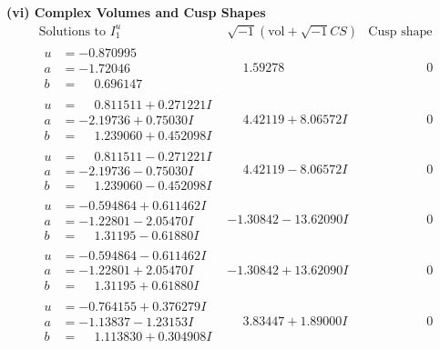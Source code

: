 \documentclass[1p]{elsarticle_modified}
\theoremstyle{definition}
\newcommand{\I}{\sqrt{-1}}
\begin{document}
\newpage\flushleft \textbf{(vi) Complex Volumes and Cusp Shapes}
$$\begin{array}{c|c|c}  
\text{Solutions to }I^u_{1}& \I (\text{vol} + \sqrt{-1}CS) & \text{Cusp shape}\\
 \hline 
\begin{aligned}
u &= -0.870995\phantom{ +0.000000I} \\
a &= -1.72046\phantom{ +0.000000I} \\
b &= \phantom{-}0.696147\phantom{ +0.000000I}\end{aligned}
 & \phantom{-}1.59278\phantom{ +0.000000I} & \phantom{-0.000000 } 0 \\ \hline\begin{aligned}
u &= \phantom{-}0.811511 + 0.271221 I \\
a &= -2.19736 + 0.75030 I \\
b &= \phantom{-}1.239060 + 0.452098 I\end{aligned}
 & \phantom{-}4.42119 + 8.06572 I & \phantom{-0.000000 } 0 \\ \hline\begin{aligned}
u &= \phantom{-}0.811511 - 0.271221 I \\
a &= -2.19736 - 0.75030 I \\
b &= \phantom{-}1.239060 - 0.452098 I\end{aligned}
 & \phantom{-}4.42119 - 8.06572 I & \phantom{-0.000000 } 0 \\ \hline\begin{aligned}
u &= -0.594864 + 0.611462 I \\
a &= -1.22801 - 2.05470 I \\
b &= \phantom{-}1.31195 - 0.61880 I\end{aligned}
 & -1.30842 - 13.62090 I & \phantom{-0.000000 } 0 \\ \hline\begin{aligned}
u &= -0.594864 - 0.611462 I \\
a &= -1.22801 + 2.05470 I \\
b &= \phantom{-}1.31195 + 0.61880 I\end{aligned}
 & -1.30842 + 13.62090 I & \phantom{-0.000000 } 0 \\ \hline\begin{aligned}
u &= -0.764155 + 0.376279 I \\
a &= -1.13837 - 1.23153 I \\
b &= \phantom{-}1.113830 + 0.304908 I\end{aligned}
 & \phantom{-}3.83447 + 1.89000 I & \phantom{-0.000000 } 0 \\ \hline\begin{aligned}

\end{aligned}
\end{array}$$
\end{document}
